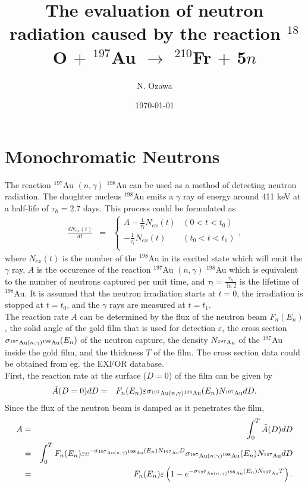 \documentclass{article}
\title{The evaluation of neutron radiation caused by the reaction $^{18}$O $+$ $^{197}$Au $\rightarrow$ $^{210}$Fr $+$ 5$n$}
\author{N. Ozawa}
\date{\today}
\begin{document}
\maketitle

\section{Monochromatic Neutrons}

The reaction $^{197}$Au $(n,\gamma)$ $^{198}$Au can be used as a method of detecting neutron radiation. The daughter nucleus $^{198}$Au emits a $\gamma$ ray of energy around 411 keV at a half-life of $\tau_h = $2.7 days. This process could be formulated as
\begin{eqnarray*}
\frac{dN_{ex}(t)}{dt} & = & \left\{
\begin{array}{lr}
    A - \frac{1}{\tau_l} N_{ex}(t) & (0 < t < t_0) \\
    - \frac{1}{\tau_l} N_{ex}(t) & (t_0 < t < t_1) \\
\end{array}
\right. ,
\end{eqnarray*}
where $N_{ex}(t)$ is the number of the $^{198}$Au in its excited state which will emit the $\gamma$ ray, $A$ is the occurence of the reaction $^{197}$Au $(n,\gamma)$ $^{198}$Au which is equivalent to the number of neutrons captured per unit time, and $\tau_l = \frac{\tau_h}{\ln2}$ is the lifetime of $^{198}$Au. It is assumed that the neutron irradiation starts at $t = 0$, the irradiation is stopped at $t = t_0$, and the $\gamma$ rays are measured at $t = t_1$. \\

The reaction rate $A$ can be determined by the flux of the neutron beam $F_n (E_n)$, the solid angle of the gold film that is used for detection $\varepsilon$, the cross section $\sigma_{^{197}{\rm Au} (n,\gamma) ^{198}{\rm Au}} (E_n)$ of the neutron capture, the density $N_{^{197}{\rm Au}}$ of the $^{197}$Au inside the gold film, and the thickness $T$ of the film. The cross section data could be obtained from eg. the EXFOR database. \\

First, the reaction rate at the surface ($D = 0$) of the film can be given by
\begin{eqnarray*}
\tilde{A}(D = 0) dD & = & F_n (E_n) \varepsilon \sigma_{^{197}{\rm Au}(n,\gamma)^{198}{\rm Au}}(E_n) N_{^{197}{\rm Au}}dD .
\end{eqnarray*}
Since the flux of the neutron beam is damped as it penetrates the film,
\begin{eqnarray*}
A & = & \int_{0}^{T} \tilde{A}(D) dD \\
& = & \int_{0}^{T} F_n (E_n) \varepsilon e^{-\sigma_{^{197}{\rm Au}(n,\gamma)^{198}{\rm Au}}(E_n) N_{^{197}{\rm Au}}D} \sigma_{^{197}{\rm Au}(n,\gamma)^{198}{\rm Au}}(E_n) N_{^{197}{\rm Au}}dD \\
& = & F_n (E_n) \varepsilon \left( 1 - e^{-\sigma_{^{197}{\rm Au}(n,\gamma)^{198}{\rm Au}}(E_n) N_{^{197}{\rm Au}} T} \right). \\
\end{eqnarray*}
\end{document}
